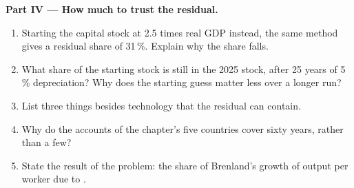 \begin{problem}
\medskip
\noindent\textbf{Part IV --- How much to trust the residual.}
\begin{enumerate}[resume]
\item Starting the capital stock at 2.5 times real GDP instead, the same method gives a residual share of 31\,\%. Explain why the share falls.
\item What share of the starting stock is still in the 2025 stock, after 25 years of 5\,\% depreciation? Why does the starting guess matter less over a longer run?
\item List three things besides technology that the residual can contain.
\item Why do the accounts of the chapter's five countries cover sixty years, rather than a few?
\item State the result of the problem: the share of Brenland's growth of output per worker due to .
\end{enumerate}
\end{problem}
